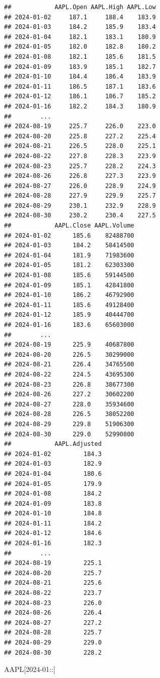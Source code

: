\documentclass[]{ctexbook}
\newenvironment{Shaded}{\begin{snugshade}}{\end{snugshade}}
\newcommand{\NormalTok}[1]{#1}
\newcommand{\StringTok}[1]{\textcolor[rgb]{0.31,0.60,0.02}{#1}}
\begin{document}
\begin{verbatim}
##            AAPL.Open AAPL.High AAPL.Low
## 2024-01-02     187.1     188.4    183.9
## 2024-01-03     184.2     185.9    183.4
## 2024-01-04     182.1     183.1    180.9
## 2024-01-05     182.0     182.8    180.2
## 2024-01-08     182.1     185.6    181.5
## 2024-01-09     183.9     185.1    182.7
## 2024-01-10     184.4     186.4    183.9
## 2024-01-11     186.5     187.1    183.6
## 2024-01-12     186.1     186.7    185.2
## 2024-01-16     182.2     184.3    180.9
##        ...                             
## 2024-08-19     225.7     226.0    223.0
## 2024-08-20     225.8     227.2    225.4
## 2024-08-21     226.5     228.0    225.1
## 2024-08-22     227.8     228.3    223.9
## 2024-08-23     225.7     228.2    224.3
## 2024-08-26     226.8     227.3    223.9
## 2024-08-27     226.0     228.9    224.9
## 2024-08-28     227.9     229.9    225.7
## 2024-08-29     230.1     232.9    228.9
## 2024-08-30     230.2     230.4    227.5
##            AAPL.Close AAPL.Volume
## 2024-01-02      185.6    82488700
## 2024-01-03      184.2    58414500
## 2024-01-04      181.9    71983600
## 2024-01-05      181.2    62303300
## 2024-01-08      185.6    59144500
## 2024-01-09      185.1    42841800
## 2024-01-10      186.2    46792900
## 2024-01-11      185.6    49128400
## 2024-01-12      185.9    40444700
## 2024-01-16      183.6    65603000
##        ...                       
## 2024-08-19      225.9    40687800
## 2024-08-20      226.5    30299000
## 2024-08-21      226.4    34765500
## 2024-08-22      224.5    43695300
## 2024-08-23      226.8    38677300
## 2024-08-26      227.2    30602200
## 2024-08-27      228.0    35934600
## 2024-08-28      226.5    38052200
## 2024-08-29      229.8    51906300
## 2024-08-30      229.0    52990800
##            AAPL.Adjusted
## 2024-01-02         184.3
## 2024-01-03         182.9
## 2024-01-04         180.6
## 2024-01-05         179.9
## 2024-01-08         184.2
## 2024-01-09         183.8
## 2024-01-10         184.8
## 2024-01-11         184.2
## 2024-01-12         184.6
## 2024-01-16         182.3
##        ...              
## 2024-08-19         225.1
## 2024-08-20         225.7
## 2024-08-21         225.6
## 2024-08-22         223.7
## 2024-08-23         226.0
## 2024-08-26         226.4
## 2024-08-27         227.2
## 2024-08-28         225.7
## 2024-08-29         229.0
## 2024-08-30         228.2
\end{verbatim}

\begin{Shaded}
\begin{Highlighting}[]
\NormalTok{AAPL[}\StringTok{\textquotesingle{}2024{-}01::\textquotesingle{}}\NormalTok{]}
\end{Highlighting}
\end{Shaded}
\end{document}
